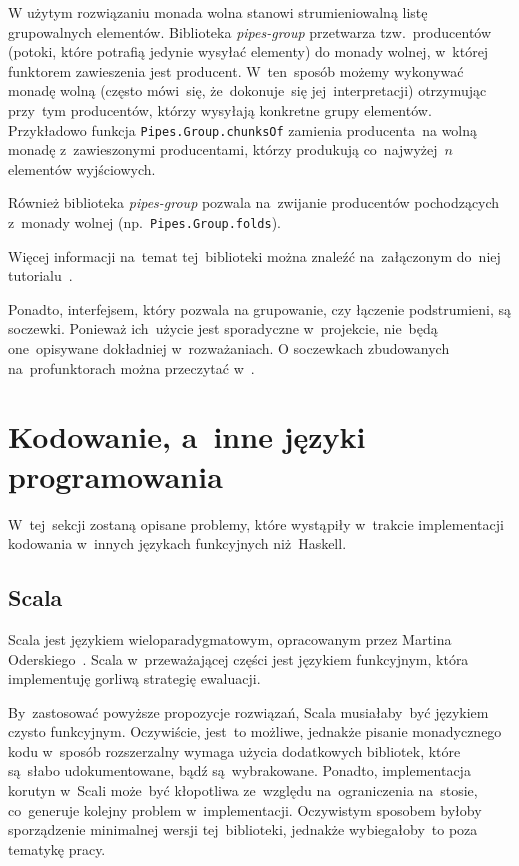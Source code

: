 \documentclass[../../praca.tex]{subfiles}
\begin{document}
W użytym rozwiązaniu monada wolna stanowi strumieniowalną listę grupowalnych
elementów. Biblioteka \emph{pipes-group} przetwarza tzw.~producentów
(potoki, które potrafią jedynie wysyłać elementy) do monady wolnej,
w~której funktorem zawieszenia jest producent. W~ten~sposób możemy 
wykonywać monadę wolną (często mówi~się, że~dokonuje~się jej~interpretacji)
otrzymując przy~tym producentów, którzy wysyłają konkretne grupy elementów.
Przykładowo funkcja \texttt{Pipes.Group.chunksOf} zamienia producenta~na wolną monadę
z~zawieszonymi producentami, którzy produkują co~najwyżej~\( n \) elementów
wyjściowych.

Również biblioteka \emph{pipes-group} pozwala na~zwijanie producentów
pochodzących z~monady wolnej (np.~\texttt{Pipes.Group.folds}).

Więcej informacji na~temat tej~biblioteki można znaleźć na~załączonym
do~niej tutorialu~\cite{Hackage:Pipes-Groups-Tut}.

Ponadto, interfejsem, który pozwala na grupowanie, czy łączenie podstrumieni,
są soczewki. Ponieważ ich~użycie jest sporadyczne w~projekcie, nie~będą
one~opisywane dokładniej w~rozważaniach. O soczewkach zbudowanych
na~profunktorach można przeczytać w~\cite{Pickering_2017}.

\section{Kodowanie, a~inne języki programowania}

W~tej~sekcji zostaną opisane problemy, które wystąpiły w~trakcie implementacji
kodowania w~innych językach funkcyjnych niż~Haskell. 

\subsection{Scala}

Scala jest językiem wieloparadygmatowym, opracowanym przez Martina Oderskiego~\cite{Odersky:BHS}.
Scala w~przeważającej części jest językiem funkcyjnym, która implementuję gorliwą strategię
ewaluacji.

By~zastosować powyższe propozycje rozwiązań, Scala musiałaby~być językiem czysto funkcyjnym.
Oczywiście, jest~to możliwe, jednakże pisanie monadycznego kodu w~sposób rozszerzalny
wymaga użycia dodatkowych bibliotek, które są~słabo udokumentowane, bądź są~wybrakowane.
Ponadto, implementacja korutyn w~Scali może~być kłopotliwa ze~względu na~ograniczenia
na~stosie, co~generuje kolejny problem w~implementacji. Oczywistym sposobem byłoby
sporządzenie minimalnej wersji tej~biblioteki, jednakże wybiegałoby~to poza tematykę pracy.
\end{document}
